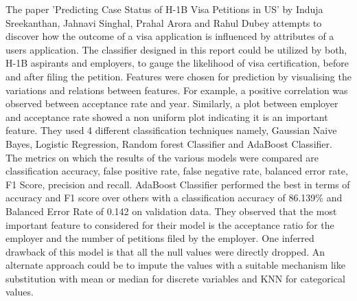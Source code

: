 \documentclass[conference]{IEEEtran}
\begin{document}
The paper 'Predicting Case Status of H-1B Visa Petitions in US' by Induja Sreekanthan, Jahnavi Singhal, Prahal Arora and Rahul Dubey attempts to discover how the outcome of a visa application is influenced by attributes of a users application. The classifier designed in this report could be utilized by both, H-1B aspirants and employers, to gauge the likelihood of visa certification, before and after filing the petition. Features were chosen for prediction by visualising the variations and relations between features. For example, a positive correlation was observed between acceptance rate and year. Similarly, a plot between employer and acceptance rate showed a non uniform plot indicating it is an important feature. They used 4 different classification techniques namely, Gaussian Naive Bayes, Logistic Regression, Random forest Classifier and AdaBoost Classifier. The metrics on which the results of the various models were compared are classification accuracy, false positive rate, false negative rate, balanced error rate, F1 Score, precision and recall. AdaBoost Classifier performed the best in terms of accuracy and F1 score over others with a classification accuracy of 86.139\% and Balanced Error Rate of 0.142 on validation data. They observed that the most important feature to considered for their model is the acceptance ratio for the employer and the number of petitions filed by the employer. One inferred drawback of this model is that all the null values were directly dropped. An alternate approach could be to impute the values with a suitable mechanism like substitution with mean or median for discrete variables and KNN for categorical values.
\end{document}

